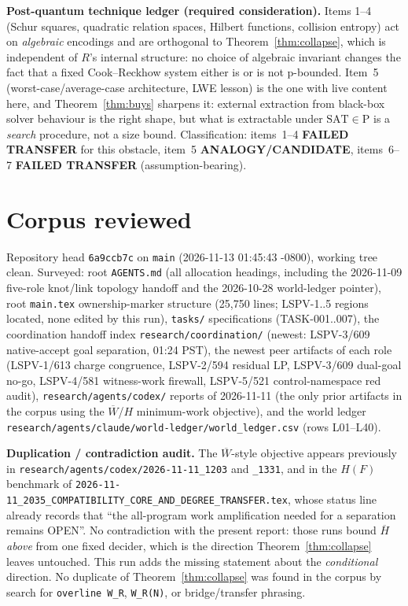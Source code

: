 \documentclass[11pt]{article}
\theoremstyle{definition}
\newcommand{\Wbar}{\overline W}
\begin{document}
\textbf{Post-quantum technique ledger (required consideration).} Items 1--4
(Schur squares, quadratic relation spaces, Hilbert functions, collision
entropy) act on \emph{algebraic} encodings and are orthogonal to
Theorem~\ref{thm:collapse}, which is independent of $R$'s internal structure:
no choice of algebraic invariant changes the fact that a fixed Cook--Reckhow
system either is or is not p-bounded. Item~5 (worst-case/average-case
architecture, LWE lesson) is the one with live content here, and
Theorem~\ref{thm:buys} sharpens it: external extraction from black-box solver
behaviour is the right shape, but what is extractable under
$\mathrm{SAT}\in\mathrm P$ is a \emph{search} procedure, not a size bound.
Classification: items~1--4 \textbf{FAILED TRANSFER} for this obstacle,
item~5 \textbf{ANALOGY/CANDIDATE}, items~6--7 \textbf{FAILED TRANSFER}
(assumption-bearing).

\section{Corpus reviewed}

Repository head \texttt{6a9ccb7c} on \texttt{main}
(2026-11-13 01:45:43 -0800), working tree clean. Surveyed: root
\texttt{AGENTS.md} (all allocation headings, including the 2026-11-09
five-role knot/link topology handoff and the 2026-10-28 world-ledger pointer),
root \texttt{main.tex} ownership-marker structure (25{,}750 lines; LSPV-1..5
regions located, none edited by this run), \texttt{tasks/} specifications
(TASK-001..007), the coordination handoff index
\texttt{research/coordination/} (newest: LSPV-3/609 native-accept goal
separation, 01:24 PST), the newest peer artifacts of each role
(LSPV-1/613 charge congruence, LSPV-2/594 residual LP, LSPV-3/609 dual-goal
no-go, LSPV-4/581 witness-work firewall, LSPV-5/521 control-namespace
red audit), \texttt{research/agents/codex/} reports of 2026-11-11 (the
only prior artifacts in the corpus using the $\Wbar$/$H$ minimum-work
objective), and the world ledger
\texttt{research/agents/claude/world-ledger/world\_ledger.csv} (rows L01--L40).

\textbf{Duplication / contradiction audit.} The $\Wbar$-style objective
appears previously in \texttt{research/agents/codex/2026-11-11\_1203} and
\texttt{\_1331}, and in the $H(F)$ benchmark of
\texttt{2026-11-11\_2035\_COMPATIBILITY\_CORE\_AND\_DEGREE\_TRANSFER.tex},
whose status line already records that ``the all-program work amplification
needed for a separation remains OPEN''. No contradiction with the present
report: those runs bound $\overline H$ \emph{above} from one fixed decider,
which is the direction Theorem~\ref{thm:collapse} leaves untouched. This run
adds the missing statement about the \emph{conditional} direction. No
duplicate of Theorem~\ref{thm:collapse} was found in the corpus by search for
\texttt{overline W\_R}, \texttt{W\_R(N)}, or bridge/transfer phrasing.
\end{document}
